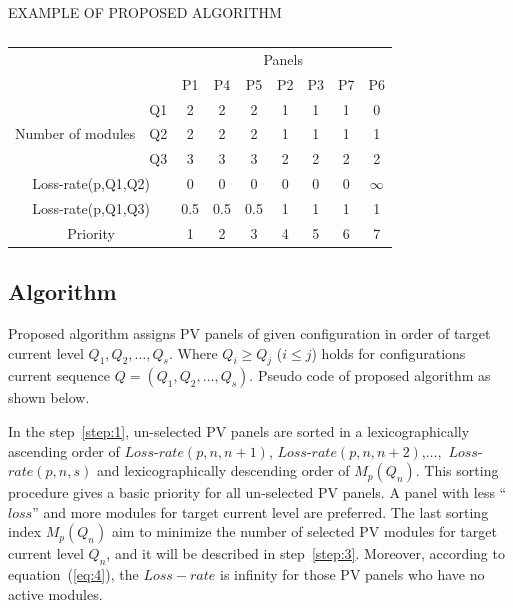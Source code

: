\documentclass[journal]{IEEEtran}
\begin{document}
\begin{table}[htbp]
  \caption[]{\label{tab:exampleofalgo}}
  \centerline{EXAMPLE OF PROPOSED ALGORITHM}
  \vskip5pt
  \begin{tabular}{c|c|ccccccc}
  \hline
  \hline
\multicolumn{2}{c|}{\multirow{2}{*}{}}  & \multicolumn{7}{c}{Panels}                                                      \\ \cline{3-9} 
\multicolumn{2}{c|}{}                   & P1  & P4  & P5                       & P2 & P3 & P7                     & P6     \\ \hline
\multirow{3}{*}{Number of modules} & Q1 & 2   & 2   & 2                        & 1  & 1  & 1                      & 0      \\ \cline{2-2}
                                   & Q2 & 2   & 2   & 2                        & 1  & 1  & 1                      & 1      \\ \cline{2-2}
                                   & Q3 & 3   & 3   & 3                        & 2  & 2  & 2                      & 2      \\ \hline
\multicolumn{2}{c|}{Loss-rate(p,Q1,Q2)} & 0   & 0   & \multicolumn{1}{c|}{0}   & 0  & 0  & \multicolumn{1}{c|}{0} & $\infty$ \\ \cline{1-2}
\multicolumn{2}{c|}{Loss-rate(p,Q1,Q3)} & 0.5 & 0.5 & \multicolumn{1}{c|}{0.5} & 1  & 1  & \multicolumn{1}{c|}{1} & 1      \\ \hline
\multicolumn{2}{c|}{Priority}           & 1   & 2   & 3                        & 4  & 5  & 6                      & 7      \\ \hline
\end{tabular}
\end{table}
\subsection{Algorithm}\label{sec:algorithm}
Proposed algorithm assigns PV panels of given configuration in order of target current level $Q_{1}, Q_{2},\dots, Q_{s}$.
Where $Q_{i}\geq Q_{j}$ ($i \leq j$) holds for configurations current sequence $Q = (Q_{1},Q_{2},\dots,Q_{s})$.
Pseudo code of proposed algorithm as shown below.

In the step~\ref{step:1}, un-selected PV panels are sorted  in a lexicographically  ascending order of $Loss$-$rate(p,n,n+1)$, $Loss$-$rate(p,n,n+2)$,$\dots,$ $Loss$-$rate(p,n,s)$ and  lexicographically descending order of $M_{p}(Q_{n})$.
This sorting procedure gives a basic priority for all un-selected PV panels.
A panel with less ``$loss$'' and more modules for target current level are preferred.
The last sorting index $M_{p}(Q_{n})$ aim to minimize the number of selected PV modules for target current level $Q_{n}$, and it will be described in step~\ref{step:3}.
Moreover, according to equation~(\ref{eq:4}), the $Loss-rate$ is infinity for those PV panels who have no active modules.
\end{document}

